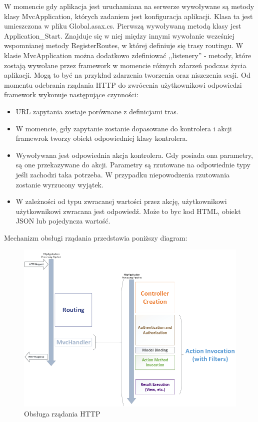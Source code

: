 W momencie gdy aplikacja jest uruchamiana na serwerze wywoływane są metody klasy MvcApplication, których zadaniem jest konfiguracja aplikacji. Klasa ta jest umieszczona w pliku Global.asax.cs. Pierwszą wywoływaną metodą klasy jest Application\_Start. Znajduje się w niej między innymi wywołanie wcześniej wspomnianej metody RegisterRoutes, w której definiuje się trasy routingu. W klasie MvcApplication można dodatkowo zdefiniować ,,listenery'' - metody, które zostają wywołane przez framework w momencie różnych zdarzeń podczas życia aplikacji. Mogą to być na przykład zdarzenia tworzenia oraz niszczenia sesji.
Od momentu odebrania rządania HTTP do zwrócenia użytkownikowi odpowiedzi framework wykonuje następujące czynności:
\begin{itemize}
\item URL zapytania zostaje porównane z definicjami tras.
\item W momencie, gdy zapytanie zostanie dopasowane do kontrolera i akcji framewrok tworzy obiekt odpowiedniej klasy kontrolera. 
\item Wywoływana jest odpowiednia akcja kontrolera. Gdy posiada ona parametry, są one przekazywane do akcji. Parametry są rzutowane na odpowiednie typy jeśli zachodzi taka potrzeba. W przypadku niepowodzenia rzutowania zostanie wyrzucony wyjątek.
\item W zależności od typu zwracanej wartości przez akcję, użytkownikowi użytkownikowi zwracana jest odpowiedź. Może to byc kod HTML, obiekt JSON lub pojedyncza wartość.
\end{itemize}


Mechanizm obsługi rządania przedstawia poniższy diagram:
\begin{figure}[h]
	\includegraphics[width=140mm]{./img/mvc-diagram.png}
	\caption{Obsługa rządania HTTP}
	\label{fig:mvc-diagram}
\end{figure}


